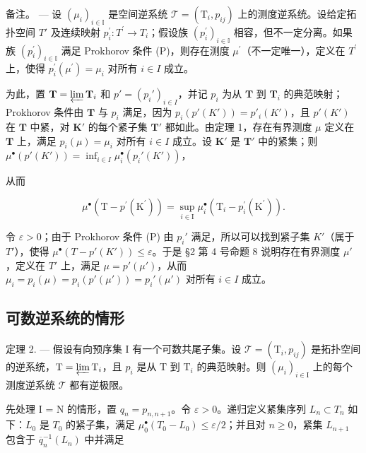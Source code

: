 备注。 --- 设 \((\mu_{i})_{i\in\mathbb{I}}\) 是空间逆系统 \(\mathcal{T}=(\mathrm{T}_{i},p_{ij})\) 上的测度逆系统。设给定拓扑空间 \(T'\) 及连续映射 \(p_{i}^{\prime}:T^{\prime}\to T_{i}\)；假设族 \((p_{i}^{\prime})_{i\in\mathbb{I}}\) 相容，但不一定分离。如果族 \((p_{i}^{\prime})_{i\in\mathbb{I}}\) 满足 Prokhorov 条件 (P)，则存在测度 \(\mu^{\prime}\)（不一定唯一），定义在 \(T^{\prime}\) 上，使得 \(p_{i}^{\prime}(\mu^{\prime})=\mu_{i}\) 对所有 \(i\in I\) 成立。

为此，置 \(\mathbf{T} = \varprojlim \mathbf{T}_i\) 和 \(p' = (p_i')_{i\in I}\)，并记 \(p_i\) 为从 \(\mathbf{T}\) 到 \(\mathbf{T}_i\) 的典范映射；Prokhorov 条件由 \(\mathbf{T}\) 与 \(p_i\) 满足，因为 \(p_i(p'(K')) = p'_i(K')\)，且 \(p'(K')\) 在 \(\mathbf{T}\) 中紧，对 \(\mathbf{K}'\) 的每个紧子集 \(\mathbf{T}'\) 都如此。由定理 1，存在有界测度 \(\mu\) 定义在 \(\mathbf{T}\) 上，满足 \(p_i(\mu) = \mu_i\) 对所有 \(i\in I\) 成立。设 \(\mathbf{K}'\) 是 \(\mathbf{T}'\) 中的紧集；则 \(\mu^\bullet (p'(K')) = \inf_{i\in I}\mu_i^\bullet (p_i'(K'))\)，

从而

\[
\mu^ {\bullet} \left(\mathrm{T} - p ^ {\prime} \left(\mathrm{K} ^ {\prime}\right)\right) = \sup _ {i \in \mathrm{I}} \mu_ {i} ^ {\bullet} \left(\mathrm{T} _ {i} - p _ {i} ^ {\prime} \left(\mathrm{K} ^ {\prime}\right)\right).
\]

令 \(\varepsilon > 0\)；由于 Prokhorov 条件 (P) 由 \(p_i'\) 满足，所以可以找到紧子集 \(K'\)（属于 \(T'\)），使得 \(\mu^\bullet(T - p'(K')) \leqslant \varepsilon\)。于是 §2 第 4 号命题 8 说明存在有界测度 \(\mu'\)，定义在 \(T'\) 上，满足 \(\mu = p'(\mu')\)，从而 \(\mu_i = p_i(\mu) = p_i(p'(\mu')) = p_i'(\mu')\) 对所有 \(i \in I\) 成立。

\subsection{可数逆系统的情形}

定理 2. --- 假设有向预序集 I 有一个可数共尾子集。设 \(\mathcal{T} = (\mathrm{T}_i, p_{ij})\) 是拓扑空间的逆系统，\(\mathrm{T} = \varprojlim \mathrm{T}_i\)，且 \(p_i\) 是从 \(\mathrm{T}\) 到 \(\mathrm{T}_i\) 的典范映射。则 \((\mu_i)_{i \in \mathrm{I}}\) 上的每个测度逆系统 \(\mathcal{T}\) 都有逆极限。

先处理 I = N 的情形，置 \(q_{n} = p_{n,n+1}\)。令 \(\varepsilon > 0\)。递归定义紧集序列 \(L_{n} \subset T_{n}\) 如下：\(L_{0}\) 是 \(T_{0}\) 的紧子集，满足 \(\mu_{0}^{\bullet}(T_{0} - L_{0}) \leqslant \varepsilon / 2\)；并且对 \(n \geqslant 0\)，紧集 \(L_{n+1}\) 包含于 \(\overline{q}_{n}^{-1}(L_{n})\) 中并满足

